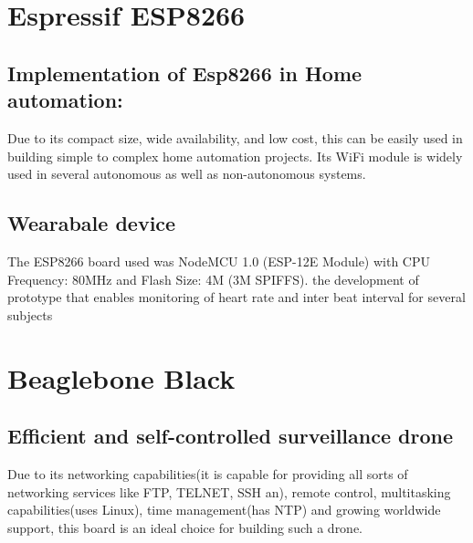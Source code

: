 \documentclass[a4paper,11pt]{article}
\begin{document}
\begin{iotsolution}
\section{Espressif ESP8266}
\subsection{Implementation of Esp8266 in Home automation:}
Due to its compact size, wide availability, and low cost, this can be easily used in building simple to complex home automation projects. Its WiFi module is widely used in several autonomous as well as non-autonomous systems.

\subsection{Wearabale device}  
The ESP8266 board used was NodeMCU 1.0 (ESP-12E Module) with CPU Frequency: 80MHz and Flash Size: 4M (3M SPIFFS). the development of prototype that enables monitoring of heart rate and inter beat interval for several subjects

\section{Beaglebone Black}
\subsection{Efficient and self-controlled  surveillance  drone } Due to its networking  capabilities(it  is  capable  for  providing  all  sorts  of networking  services  like  FTP,  TELNET,  SSH  an), remote  control, multitasking capabilities(uses Linux), time  management(has NTP) and growing worldwide support, this board is an ideal choice for building such a drone. 




\end{iotsolution}



\end{document}
